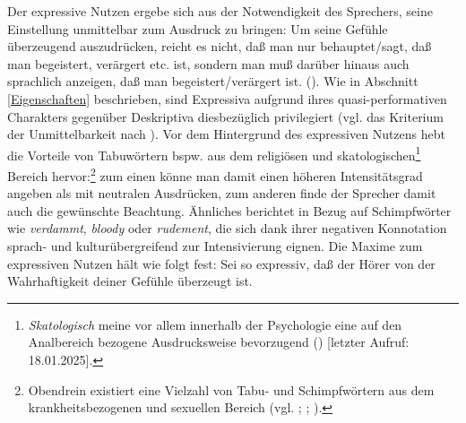 Der expressive Nutzen ergebe sich aus der Notwendigkeit des Sprechers, seine Einstellung unmittelbar zum Ausdruck zu bringen: \glqq{}Um seine Gefühle überzeugend auszudrücken, reicht es nicht, daß man nur behauptet/sagt, daß man begeistert, verärgert etc. ist, sondern man muß darüber hinaus auch sprachlich anzeigen, daß man begeistert/verärgert ist.\grqq{} ({\citealt[189]{Kirschbaum.2002b}}). Wie in Abschnitt \ref{Eigenschaften} beschrieben, sind Expressiva aufgrund ihres quasi-performativen Charakters gegenüber Deskriptiva diesbezüglich privilegiert (vgl. das Kriterium der Unmittelbarkeit nach \citealt[179ff.]{Potts.2007a}). Vor dem Hintergrund des expressiven Nutzens hebt {\citet[189]{Kirschbaum.2002b}} die Vorteile von Tabuwörtern bspw. aus dem religiösen und skatologischen\footnote{\textit{Skatologisch} meine vor allem innerhalb der Psychologie \glqq{}eine auf den Analbereich bezogene Ausdrucksweise bevorzugend\grqq{} (\citealt[]{Duden.online}) [letzter Aufruf: 18.01.2025].} Bereich hervor:\footnote{Obendrein existiert eine Vielzahl von Tabu- und Schimpfwörtern aus dem krankheitsbezogenen und sexuellen Bereich (vgl. \citealt[]{Balle.1990}; \citealt[]{Nuebling.2004a}; \citealt[266ff.]{Hartmann.2018}).} zum einen könne man damit einen höheren Intensitätsgrad angeben als mit neutralen Ausdrücken, zum anderen finde der Sprecher damit auch die gewünschte  Beachtung. Ähnliches berichtet \citet[131]{Hentschel.1998b} in Bezug auf Schimpfwörter wie \textit{verdammt}, \textit{bloody} oder \textit{rudement}, die sich dank ihrer negativen Konnotation sprach- und kulturübergreifend zur Intensivierung eignen. Die Maxime zum expressiven Nutzen hält \citet[190]{Kirschbaum.2002b} wie folgt fest: \glqq{}Sei so expressiv, daß der Hörer von der Wahrhaftigkeit deiner Gefühle {überzeugt ist.}\grqq{}


